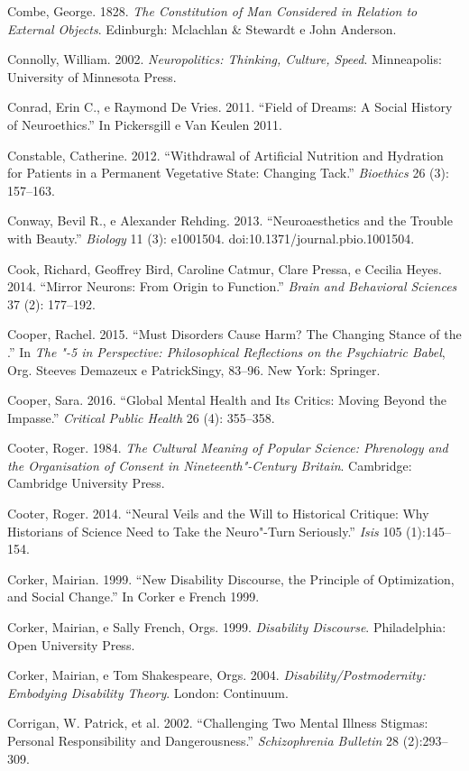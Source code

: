 Combe, George. 1828. \emph{The Constitution of Man Considered in
Relation to External Objects}. Edinburgh: Mclachlan \& Stewardt e John
Anderson.

Connolly, William. 2002. \emph{Neuropolitics: Thinking, Culture, Speed}.
Minneapolis: University of Minnesota Press.

Conrad, Erin C., e Raymond De Vries. 2011. ``Field of Dreams: A Social
History of Neuroethics.'' In Pickersgill e Van Keulen 2011.

Constable, Catherine. 2012. ``Withdrawal of Artificial Nutrition and
Hydration for Patients in a Permanent Vegetative State: Changing Tack.''
\emph{Bioethics} 26 (3): 157--163.

Conway, Bevil R., e Alexander Rehding. 2013. ``Neuroaesthetics and the
Trouble with Beauty.'' \emph{ Biology} 11 (3): e1001504.
doi:10.1371/journal.pbio.1001504.

Cook, Richard, Geoffrey Bird, Caroline Catmur, Clare Pressa, e Cecilia
Heyes. 2014. ``Mirror Neurons: From Origin to Function.'' \emph{Brain
and Behavioral Sciences} 37 (2): 177--192.

Cooper, Rachel. 2015. ``Must Disorders Cause Harm? The Changing Stance
of the .'' In \emph{The "-5 in Perspective: Philosophical
Reflections on the Psychiatric Babel}, Org. Steeves Demazeux e
PatrickSingy, 83--96. New York: Springer.

Cooper, Sara. 2016. ``Global Mental Health and Its Critics: Moving
Beyond the Impasse.'' \emph{Critical Public Health} 26 (4): 355--358.

Cooter, Roger. 1984. \emph{The Cultural Meaning of Popular Science:
Phrenology and the Organisation of Consent in Nineteenth"-Century
Britain}. Cambridge: Cambridge University Press.

Cooter, Roger. 2014. ``Neural Veils and the Will to Historical Critique:
Why Historians of Science Need to Take the Neuro"-Turn Seriously.''
\emph{Isis} 105 (1):145--154.

Corker, Mairian. 1999. ``New Disability Discourse, the Principle of
Optimization, and Social Change.'' In Corker e French 1999.

Corker, Mairian, e Sally French, Orgs. 1999. \emph{Disability
Discourse}. Philadelphia: Open University Press.

Corker, Mairian, e Tom Shakespeare, Orgs. 2004.
\emph{Disability/Postmodernity: Embodying Disability Theory}. London:
Continuum.

Corrigan, W. Patrick, et al. 2002. ``Challenging Two Mental Illness
Stigmas: Personal Responsibility and Dangerousness.''
\emph{Schizophrenia Bulletin} 28 (2):293--309.

